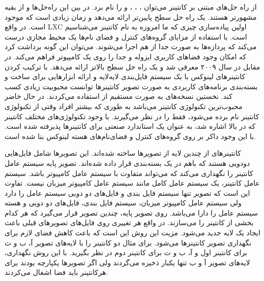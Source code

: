     از راه حل‌های مبتنی بر کانتینر می‌توان \cite{2019vserver}، \cite{2019openvz}، \cite{2019containers}، \cite{2019docker} و \cite{2019rtk} را نام برد.
    در بین این راه‌حل‌ها  و  از بقیه مشهورتر هستند.
     یک راه حل سطح پایین‌تر ارائه می‌دهد و زمان زیادی است که موجود است.
    در واقع LXC اولین پیاده‌سازی چیزی که ما امروزه به نام کانتینر می‌شناسیم است.
     با استفاده از مزایای گروه‌های کنترل و فضای نام‌ها یک محیط مجازی درست می‌کند که پردازه‌ها به صورت جدا از هم اجرا می‌شوند.
    می‌توان این گونه برداشت کرد که  امکان وجود فضا‌های کاربری ایزوله و جدا را روی یک کامپیوتر فراهم می‌کند.
    در مقابل  در سال ۲۰۰۹ معرفی شد و یک راه حل سطح بالاتر ارائه می‌دهد.
     با ترکیب کردن کانتینر‌های لینوکس با یک سیستم فایل‌بندی لایه‌لایه و ارائه ابزار‌هایی برای ساخت و بسته‌بندی برنامه‌های کاربردی به صورت تصویر کانتینر‌ها توانست محبوبیت زیادی کسب کند.
    نخستین نسخه‌های  به صورت مستقیم از  استفاده می‌کردند.
    در حال خاضر  محبوب‌ترین تکنولوژی کانتینر می‌باشد به طوری که بیشتر افراد وقتی از تکنولوژی کانتینر نام برده می‌شود، فقط  را در نظر می‌گیرند.
    با وجود تکنولوژی‌های مختلف کانتینر که در بالا اشاره شد،  به عنوان یک استاندارد صنعتی برای کانتینر‌ها پذیرفته شده است.
    با این وجود داکر بر روی گروه‌های کنترل و فضای‌نام‌های هسته لینوکس بنا شده است.

    کانتینر‌های  از چندین لایه از تصویر‌ها ساخته شده‌اند.
    این تصویر‌ها شامل فایل‌هایی دودویی هستند که باهم در یک بسته‌بندی قرار داده‌ شده‌اند.
    تصویر پایه سیستم عامل کانتینر را نگهداری می‌کند که می‌تواند متفاوت با سیستم عامل کامپیوتر باشد.
    سیستم عامل کانتینر، یک سیستم عامل کامل مانند سیستم عامل کامپیوتر میزبان نیست.
    تفاوت این است که تصویر تنها سیستم فایل بندی و فایل‌های دو دویی سیستم عامل را دارد ولی سیستم عامل کامپیوتر میزبان، سیستم فایل بندی، فایل‌های دو دویی و هسته سیستم عامل را دارا می‌باشد.
    روی تصویر پایه، چندین تصویر قرار می‌گیرد که هر کدام بخشی از کانتینر را می‌سازند.
    در واقع هر تغییری روی فایل‌های تصویر‌های قبلی باعث ایجاد یک لایه جدید می‌شود.
    مزیت این روش این است که باعث کاهش فضای لازم برای نگهداری تصویر کانتینر‌ها می‌شود.
    برای مثال دو کانتینر را با لایه‌های تصویر آ، ب و ث برای کانتینر اول و آ، ب و ت برای کانتینر دوم در نظر بگیرید.
    با این روش نگهداری، لایه‌های تصویر آ و ب تنها یکبار ذخیره می‌گردند ولی اگر تصویر‌ها یکپارچه بودند برای هرکانتینر باید فضا اشغال می‌کردند.

